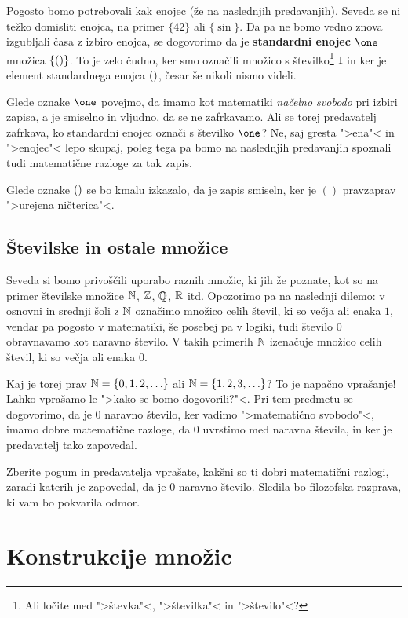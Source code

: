 Pogosto bomo potrebovali kak enojec (že na naslednjih predavanjih). Seveda se ni težko domisliti enojca, na primer $\{42\}$ ali $\{\sin\}$. Da pa ne bomo vedno znova izgubljali časa z izbiro enojca, se dogovorimo da je \textbf{standardni enojec $\one$} množica $\{()\}$. To je zelo čudno, ker smo označili množico s številko\footnote{Ali ločite med ">števka"<, ">številka"< in ">število"<?} $1$ in ker je element standardnega enojca $()$, česar še nikoli nismo videli.

Glede oznake $\one$ povejmo, da imamo kot matematiki \emph{načelno svobodo} pri izbiri zapisa, a je smiselno in vljudno, da se ne zafrkavamo. Ali se torej predavatelj zafrkava, ko standardni enojec označi s številko $\one$? Ne, saj gresta ">ena"< in ">enojec"< lepo skupaj, poleg tega pa bomo na naslednjih predavanjih spoznali tudi matematične razloge za tak zapis.

Glede oznake $()$ se bo kmalu izkazalo, da je zapis smiseln, ker je $()$ pravzaprav ">urejena ničterica"<.

\subsection{Številske in ostale množice}

Seveda si bomo privoščili uporabo raznih množic, ki jih že poznate, kot so na primer številske množice $\mathbb{N}$, $\mathbb{Z}$, $\mathbb{Q}$, $\mathbb{R}$ itd. Opozorimo pa na naslednji dilemo:
v osnovni in srednji šoli z $\mathbb{N}$ označimo množico celih števil, ki so večja ali enaka $1$, vendar pa pogosto v matematiki, še posebej pa v logiki, tudi število $0$ obravnavamo kot naravno število. V takih primerih $\mathbb{N}$ izenačuje množico celih števil, ki so večja ali enaka $0$.

Kaj je torej prav $\mathbb{N} = \{0, 1, 2, \ldots\}$ ali $\mathbb{N} = \{1, 2, 3, \ldots\}$? To je napačno vprašanje! Lahko vprašamo le ">kako se bomo dogovorili?"<. Pri tem predmetu se
dogovorimo, da je $0$ naravno število, ker vadimo ">matematično svobodo"<, imamo dobre matematične razloge, da $0$ uvrstimo med naravna števila, in ker je predavatelj tako zapovedal.

\begin{naloga}
  Zberite pogum in predavatelja vprašate, kakšni so ti dobri matematični razlogi, zaradi katerih je zapovedal, da je $0$ naravno število. Sledila bo filozofska razprava, ki vam bo pokvarila odmor.
\end{naloga}

\section{Konstrukcije množic}

